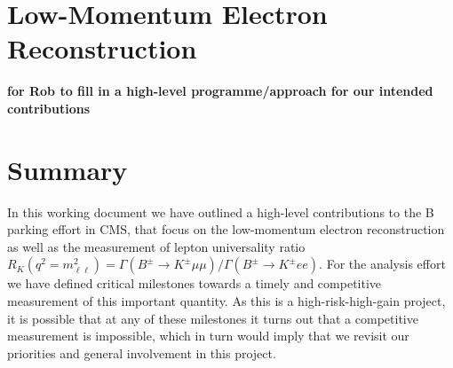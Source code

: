 \documentclass[a4paper,11pt]{article}
\begin{document}
\section{Low-Momentum Electron Reconstruction}\label{electron}
{\bf for Rob to fill in a high-level programme/approach for our intended contributions} 

\section{Summary}
In this working document we have outlined a high-level contributions to the B parking effort in CMS, that focus on the low-momentum electron reconstruction as well as the measurement of lepton universality ratio $R_{K} (q^2 = m_{\ell\ell}^2)= \Gamma (B^{\pm} \rightarrow K^{\pm} \mu \mu )/\Gamma (B^{\pm} \rightarrow K^{\pm}  e e)$. For the analysis effort we have defined critical milestones towards a timely and competitive measurement of this important quantity. As this is a high-risk-high-gain project, it is possible that at any of these milestones it turns out that a competitive measurement is impossible, which in turn would imply that we revisit our priorities and general involvement in this project.   



\end{document}
